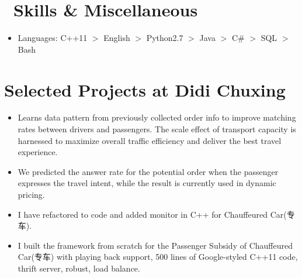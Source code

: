 \documentclass{resume}
\begin{document}

\section{\faCogs\ Skills \& Miscellaneous}
\begin{itemize}[parsep=0.5ex]
  \item Languages: C++11 $>$ English $>$ Python2.7
          	$>$ Java $>$ C\# $>$ SQL $>$ Bash
\end{itemize}

\section{Selected Projects at Didi Chuxing}
 \begin{itemize}
    \item Learns data pattern from previously collected order info to improve matching rates between drivers and passengers. 
          The scale effect of transport capacity is harnessed to maximize overall traffic efficiency and deliver the best travel experience.
    \item We predicted the answer rate for the potential order when the passenger expresses the travel intent, 
          while the result is currently used in dynamic pricing.
 \end{itemize}

 \begin{itemize}
    \item I have refactored to code and added monitor in C++ for Chauffeured Car(专车).
 \end{itemize}

 \begin{itemize}
    \item I built the framework from scratch for the Passenger Subsidy of Chauffeured Car(专车) with playing back support, 
          500 lines of Google-styled C++11 code, thrift server, robust, load balance.
 \end{itemize}
\end{document}
